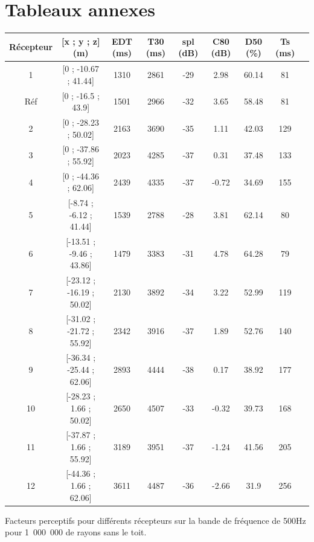 \section*{Tableaux annexes}

 \begin{tableth} 
\footnotesize
 \begin{tabular}{| *{9}{c|}} 
 \hline 
 Récepteur & [x ; y ; z] (m)  & \gls{EDT} (ms) & \gls{T30} (ms) & \gls{spl} (dB) & \gls{C80} (dB) & \gls{D50} (\%) & \gls{Ts} (ms) \\ %
 \hline 
 \hline 
1  & [0 ; -10.67 ; 41.44] &1310  &2861   &-29  &2.98  &60.14  &81 \\%
 \hline 
 Réf    &[0 ; -16.5 ; 43.9] &1501  &2966   &-32  &3.65  &58.48  &81 \\%
 \hline 
 2  & [0 ; -28.23 ; 50.02] &2163  &3690   &-35  &1.11  &42.03  &129 \\ %
 \hline 
 3  &  [0 ; -37.86 ; 55.92] &2023  &4285   &-37  &0.31  &37.48  &133 \\ %
 \hline 
 4  &  [0 ; -44.36 ; 62.06] &2439  &4335   &-37  &-0.72  &34.69  &155 \\%
 \hline 
 \hline
 5  &   [-8.74 ; -6.12 ; 41.44] &1539  &2788   &-28  &3.81  &62.14  &80 \\%
 \hline 
 6  &  [-13.51 ; -9.46 ; 43.86] &1479  &3383   &-31  &4.78  &64.28  &79 \\%
  \hline 
  7 &   [-23.12 ; -16.19 ; 50.02] &2130  &3892   &-34  &3.22  &52.99  &119 \\ %
 \hline 
 8  &  [-31.02 ; -21.72 ; 55.92] &2342  &3916   &-37  &1.89  &52.76  &140 \\ %
 \hline 
 9  & [-36.34 ; -25.44 ; 62.06] &2893  &4444   &-38  &0.17  &38.92  &177 \\ %
 \hline 
 \hline
 10  &  [-28.23 ; 1.66 ; 50.02] &2650  &4507   &-33  &-0.32  &39.73  &168 \\ %
 \hline 
11   & [-37.87 ; 1.66 ; 55.92] &3189  & 3951  &-37  & -1.24 &41.56  &205 \\%
 \hline 
12   & [-44.36 ; 1.66 ; 62.06] &3611  & 4487  & -36 &-2.66  &31.9  & 256\\ %
 \hline 
\end{tabular} 
 \caption{Facteurs perceptifs pour différents récepteurs sur la bande de fréquence de 500Hz pour 1~000~000 de rayons sans le toit.} 
 \label{tab_fac_listener_sansToit} 
 \end{tableth}
 


 
 